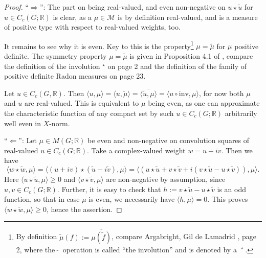 \documentclass[[a4paper,english,12pt]{amsart}
\newcommand{\wt}[1]{\widetilde{#1}}
\theoremstyle{plain}
\theoremstyle{remark}
\newcommand{\MM}{\mathcal{M}}
\newcommand{\RR}{\mathbb R}
\def\inv{\mathrm{inv}}
\begin{document}
\begin{proof} ``$\Rightarrow$'': The part on being real-valued, and even non-negative on $u\star\widetilde{u}$ for $u \in C_c(G;\RR)$ is clear, as a $\mu \in \MM$ is by definition real-valued, and is a measure of positive type with respect to real-valued weights, too.

It remains to see why it is even. Key to this is the property\footnote{By definition $\widetilde{\mu}(f):=\overline{\mu(\widetilde{f})}$, compare Argabright, Gil de Lamadrid \cite{AG-Memoirs}, page 2, where the $~\widetilde{}~$ operation is called ``the involution'' and is denoted by a $~^\star~$. } $\mu=\widetilde{\mu}$ for $\mu$ positive definite. The symmetry property $\mu=\widetilde{\mu}$ is given in Proposition 4.1 of \cite{AG-Memoirs}, compare the definition of the involution $^\star$ on page 2 and the definition of the family of positive definite Radon measures on page 23.

Let $u \in C_c(G,\RR)$. Then $\langle u,\mu\rangle=\langle u,\wt{\mu}\rangle=\overline{\langle \wt{u}, \mu\rangle} =\langle u\circ\inv ,\mu\rangle$, for now both $\mu$ and $u$ are real-valued. This is equivalent to $\mu$ being even, as one can approximate the characteristic function of any compact set by such $u \in C_c(G;\RR)$ arbitrarily well even in $X$-norm.

\medskip\noindent  ``$\Leftarrow$'': Let $\mu\in M(G;\RR)$ be even and non-negative on convolution squares of real-valued $ u \in C_c(G;\RR)$. Take a complex-valued weight $w=u+iv$. Then we have
\[
\langle w\star\widetilde{w},\mu\rangle=\langle(u+iv) \star (\wt{u} - i\wt{v}),\mu\rangle = \langle(u \star \wt{u} + v \star \wt{v} + i(v \star \wt{u}-u \star \wt{v} ) ),\mu\rangle.
\]
Here $\langle u \star \wt{u},\mu\rangle \ge 0$ and $ \langle v \star \wt{v},\mu\rangle$ are non-negative by assumption, since $u, v \in C_c(G;\RR)$. Further, it is easy to check that $h:=v \star \wt{u}-u \star \wt{v} $ is an odd function, so that in case $\mu$ is even, we necessarily have $\langle h,\mu\rangle=0$. This proves $\langle w\star\widetilde{w},\mu\rangle\ge 0$, hence the assertion.
\end{proof}
\end{document}
